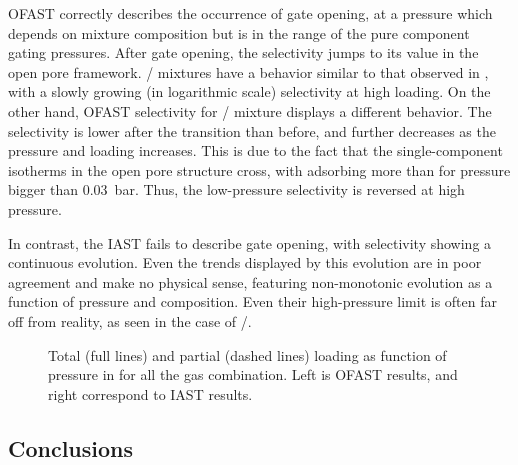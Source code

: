 \documentclass[thesis]{subfiles}
\begin{document}
OFAST correctly describes the occurrence of gate opening, at a pressure which
depends on mixture composition but is in the range of the pure component gating
pressures. After gate opening, the selectivity jumps to its value in the open
pore framework. / mixtures have a behavior similar to that
observed in \Cudhbc, with a slowly growing (in logarithmic scale) selectivity at
high loading. On the other hand, OFAST selectivity for /
mixture displays a different behavior. The selectivity is lower after the
transition than before, and further decreases as the pressure and loading
increases. This is due to the fact that the single-component isotherms  in the
open pore structure cross, with  adsorbing more than  for
pressure bigger than \SI{0.03}{bar}. Thus, the low-pressure selectivity is
reversed at high pressure.

In contrast, the IAST fails to describe gate opening, with selectivity showing a
continuous evolution. Even the trends displayed by this evolution are in poor
agreement and make no physical sense, featuring non-monotonic evolution as a
function of pressure and composition. Even their high-pressure limit is often
far off from reality, as seen in the case of /.

\begin{figure}[htp]
    \centering
    
    \caption{Total (full lines) and partial (dashed lines) loading as function
    of pressure in \RPMZn for all the gas combination. Left is OFAST results,
    and right correspond to IAST results.}
    \label{fig:rpm3-zn:iast-ofast:loadings}
\end{figure}

\FloatBarrier
\subsection*{Conclusions}
\end{document}
